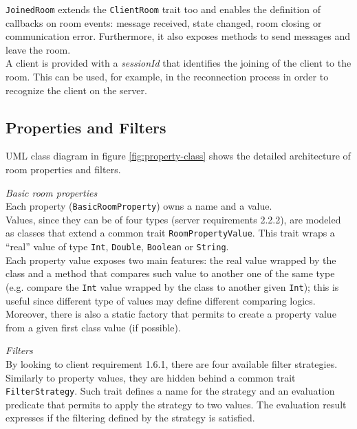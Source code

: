 \bigskip
\texttt{JoinedRoom} extends the \texttt{ClientRoom} trait too and enables the definition of callbacks on room events: message received, state changed, room closing or communication error.
Furthermore, it also exposes methods to send messages and leave the room. 
\\
A client is provided with a \textit{sessionId} that identifies the joining of the client to the room.
This can be used, for example, in the reconnection process in order to recognize the client on the server.


\subsection{Properties and Filters}  \label{room_properties_section}
UML class diagram in figure \ref{fig:property-class} shows the detailed architecture of room properties and filters.

\bigskip
\textit{Basic room properties}
\\
Each property (\texttt{BasicRoomProperty}) owns a name and a value.
\\
Values, since they can be of four types (server requirements 2.2.2), are modeled as classes that extend a common trait \texttt{RoomPropertyValue}. This trait wraps a ``real'' value of type \texttt{Int}, \texttt{Double}, \texttt{Boolean} or \texttt{String}.
\\
Each property value exposes two main features: the real value wrapped by the class and a method that compares such value to another one of the same type (e.g. compare the \texttt{Int} value wrapped by the class to another given \texttt{Int}); this is useful since different type of values may define different comparing logics.
Moreover, there is also a static factory that permits to create a property value from a given first class value (if possible).

\bigskip
\textit{Filters}
\\
By looking to client requirement 1.6.1, there are four available filter strategies. Similarly to property values, they are hidden behind a common trait \texttt{FilterStrategy}. Such trait defines a name for the strategy and an evaluation predicate that permits to apply the strategy to two values. The evaluation result expresses if the filtering defined by the strategy is satisfied.

